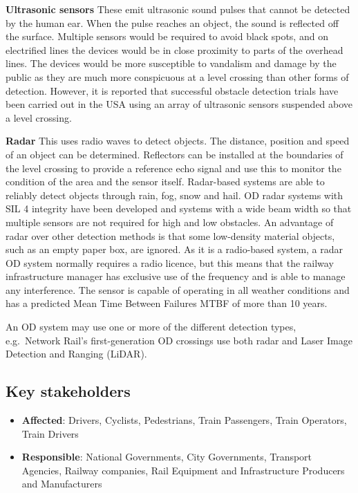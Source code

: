 \documentclass[
]{book}
\providecommand{\tightlist}{%
  \setlength{\itemsep}{0pt}\setlength{\parskip}{0pt}}
\begin{document}
\textbf{Ultrasonic sensors}
These emit ultrasonic sound pulses that cannot be detected by the human ear. When the pulse reaches an object, the sound is reflected off the surface. Multiple sensors would be required to avoid black spots, and on electrified lines the devices would be in close proximity to parts of the overhead lines. The devices would be more susceptible to vandalism and damage by the public as they are much more conspicuous at a level crossing than other forms of detection. However, it is reported that successful obstacle detection trials have been carried out in the USA using an array of ultrasonic sensors suspended above a level crossing.

\textbf{Radar}
This uses radio waves to detect objects. The distance, position and speed of an object can be determined. Reflectors can be installed at the boundaries of the level crossing to provide a reference echo signal and use this to monitor the condition of the area and the sensor itself. Radar-based systems are able to reliably detect objects through rain, fog, snow and hail. OD radar systems with SIL 4 integrity have been developed and systems with a wide beam width so that multiple sensors are not required for high and low obstacles. An advantage of radar over other detection methods is that some low-density material objects, such as an empty paper box, are ignored. As it is a radio-based system, a radar OD system normally requires a radio licence, but this means that the railway infrastructure manager has exclusive use of the frequency and is able to manage any interference. The sensor is capable of operating in all weather conditions and has a predicted Mean Time Between Failures MTBF of more than 10 years.

An OD system may use one or more of the different detection types, e.g.~Network Rail's first-generation OD crossings use both radar and Laser Image Detection and Ranging (LiDAR).

\hypertarget{key-stakeholders-1}{%
\subsection*{Key stakeholders}\label{key-stakeholders-1}}

\begin{itemize}
\tightlist
\item
  \textbf{Affected}: Drivers, Cyclists, Pedestrians, Train Passengers, Train Operators, Train Drivers
\item
  \textbf{Responsible}: National Governments, City Governments, Transport Agencies, Railway companies, Rail Equipment and Infrastructure Producers and Manufacturers
\end{itemize}
\end{document}
